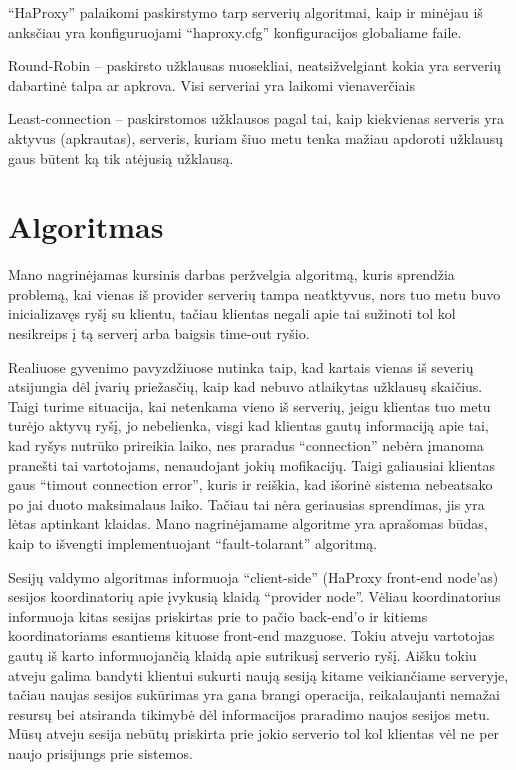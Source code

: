 \documentclass{VUMIFPSkursinis}
\begin{document}
“HaProxy” palaikomi paskirstymo tarp serverių algoritmai, kaip ir minėjau iš anksčiau yra konfiguruojami “haproxy.cfg” konfiguracijos globaliame faile.

Round-Robin – paskirsto užklausas nuosekliai, neatsižvelgiant kokia yra serverių dabartinė talpa ar apkrova. Visi serveriai yra laikomi vienaverčiais

Least-connection – paskirstomos užklausos pagal tai, kaip kiekvienas serveris yra aktyvus (apkrautas), serveris, kuriam šiuo metu tenka mažiau apdoroti užklausų gaus būtent ką tik atėjusią užklausą.

\section{Algoritmas}
Mano nagrinėjamas kursinis darbas peržvelgia algoritmą, kuris sprendžia problemą, kai vienas iš provider serverių tampa neatktyvus, nors tuo metu buvo inicializavęs ryšį su klientu, tačiau klientas negali apie tai sužinoti tol kol nesikreips į tą serverį arba baigsis time-out ryšio. 

Realiuose gyvenimo pavyzdžiuose nutinka taip, kad kartais vienas iš severių atsijungia dėl įvarių priežasčių, kaip kad nebuvo atlaikytas užklausų skaičius. Taigi turime situacija, kai netenkama vieno iš serverių, jeigu klientas tuo metu turėjo aktyvų ryšį, jo nebelienka, visgi kad klientas gautų informaciją apie tai, kad ryšys nutrūko prireikia laiko, nes praradus “connection” nebėra įmanoma pranešti tai vartotojams, nenaudojant jokių mofikacijų. Taigi galiausiai klientas gaus “timout connection error”, kuris ir reiškia, kad išorinė sistema nebeatsako po jai duoto maksimalaus laiko. Tačiau tai nėra geriausias sprendimas, jis yra lėtas aptinkant klaidas. Mano nagrinėjamame algoritme yra aprašomas būdas, kaip to išvengti implementuojant “fault-tolarant” algoritmą.
 
Sesijų valdymo algoritmas informuoja “client-side” (HaProxy front-end node’as) sesijos koordinatorių apie įvykusią klaidą “provider node”. Vėliau koordinatorius informuoja kitas sesijas priskirtas prie to pačio back-end’o ir kitiems koordinatoriams esantiems kituose front-end mazguose. Tokiu atveju vartotojas gautų iš karto informuojančią klaidą apie sutrikusį serverio ryšį. Aišku tokiu atveju galima bandyti klientui sukurti naują sesiją kitame veikiančiame serveryje, tačiau naujas sesijos sukūrimas yra gana brangi operacija, reikalaujanti nemažai resursų bei atsiranda tikimybė dėl informacijos praradimo naujos sesijos metu. Mūsų atveju sesija nebūtų priskirta prie jokio serverio tol kol klientas vėl ne per  naujo prisijungs prie sistemos.
\end{document}
